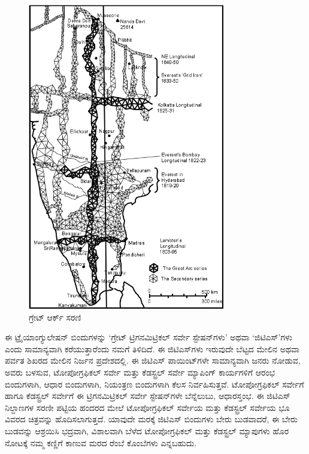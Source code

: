 \begin{figure}[!htbp]
\includegraphics{"images/image004.jpg"}
\caption{ಗ್ರೇಟ್ ಆರ್ಕ್ ಸರಣಿ}\label{chap3-fig02}
\end{figure}

ಈ ಟ್ರೈಯಾಂಗ್ಯುಲೇಷನ್​ ಬಿಂದುಗಳನ್ನು ‘ಗ್ರೇಟ್​ ಟ್ರಿಗನಮಿಟ್ರಿಕಲ್​ ಸರ್ವೇ ಸ್ಟೇಷನ್​\break ಗಳು’ ಅಥವಾ ‘ಜಿಟಿಎಸ್​’ಗಳು ಎಂದು ಸಾಮಾನ್ಯವಾಗಿ ಕರೆಯುತ್ತಾರೆಂದು ನಮಗೆ ತಿಳಿದಿದೆ. ಈ ಜಿಟಿಎಸ್​ಗಳು ಇರುವುದೇ ಬೆಟ್ಟದ ಮೇಲಿನ ಅಥವಾ ಪರ್ವತ ಶಿಖರದ ಮೇಲಿನ ನಿರ್ಜನ ಪ್ರದೇಶದಲ್ಲಿ. ಈ ಜಿಟಿಎಸ್​ ಪಾಯಿಂಟ್​ಗಳೇ ಸಾಮಾನ್ಯವಾಗಿ ಜನರು ನೋಡುವ, ಅವರು ಬಳಸುವ, ಟೋಪೋಗ್ರಫಿಕಲ್​ ಸರ್ವೇ ಮತ್ತು ಕೆಡಸ್ಟ್ರಲ್​ ಸರ್ವೇ ಮ್ಯಾಪಿಂಗ್​ ಕಾರ್ಯಗಳಿಗೆ ಆರಂಭ ಬಿಂದುಗಳಾಗಿ, ಆಧಾರ ಬಿಂದುಗಳಾಗಿ, ನಿಯಂತ್ರಣ ಬಿಂದುಗಳಾಗಿ ಕೆಲಸ ನಿರ್ವಹಿಸುತ್ತವೆ. ಟೋಪೋಗ್ರಫಿಕಲ್​ ಸರ್ವೇಗೆ ಹಾಗೂ ಕೆಡಸ್ಟ್ರಲ್​ ಸರ್ವೇಗೆ ಈ ಟ್ರಿಗನಮಿಟ್ರಿಕಲ್​ ಸರ್ವೇ ಸ್ಟೇಷನ್​ಗಳೇ ಬೆನ್ನೆಲುಬು, ಆಧಾರಸ್ತಂಭ. ಈ ಜಿಟಿಎಸ್​ ನಿಲ್ದಾಣಗಳ ಸರಣೀ ಪಟ್ಟಿಯ ಹಂದರದ ಮೇಲೆ ಟೋಪೋಗ್ರಫಿಕಲ್​ ಸರ್ವೇಯ ಮತ್ತು ಕೆಡಸ್ಟ್ರಲ್​ ಸರ್ವೇಯ ಭೂ ವಿವರದ ಚಿತ್ರವನ್ನು ಹೊದಿಸಲಾಗುತ್ತದೆ. ಯಾವುದೇ ಮರಕ್ಕೆ ಜಿಟಿಎಸ್​ ಬಿಂದುಗಳು ಬೇರು ಬುಡವಾದರೆ, ಈ ಬೇರು ಬುಡವನ್ನು ಆಶ್ರಯಿಸಿ ಭದ್ರವಾಗಿ, ವಿಶಾಲವಾಗಿ ಬೆಳೆದ ಟೋಪೋಗ್ರಫಿಕಲ್​ ಮತ್ತು ಕೆಡಸ್ಟ್ರಲ್​ ಮ್ಯಾಪುಗಳು ಹೊರ ನೋಟಕ್ಕೆ ನಮ್ಮ ಕಣ್ಣಿಗೆ ಕಾಣುವ ಮರದ ರೆಂಬೆ ಕೊಂಬೆಗಳು ಎನ್ನಬಹುದು.

